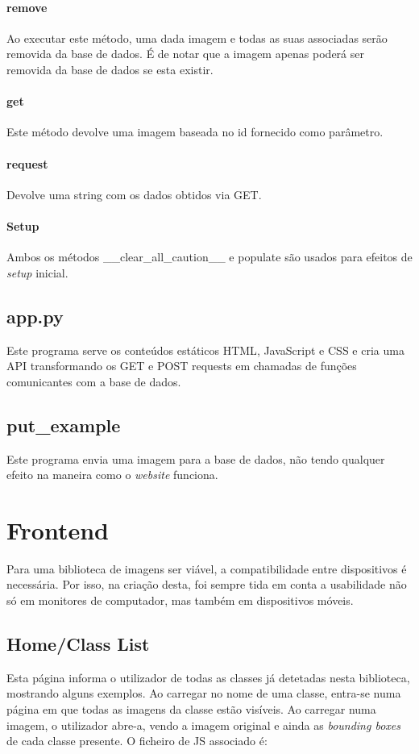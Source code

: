 \documentclass{report}
\begin{document}
\paragraph{remove}
Ao executar este método, uma dada imagem e todas as suas associadas serão removida da base de dados. É de notar que a imagem apenas poderá ser removida da base de dados se esta existir.

\paragraph{get}
Este método devolve uma imagem baseada no id fornecido como parâmetro. 

\paragraph{request}
Devolve uma string com os dados obtidos via GET.

\paragraph{Setup}
Ambos os métodos \_\_clear\_all\_caution\_\_ e  populate são usados para efeitos de \textit{setup} inicial.

\subsection{app.py}
Este programa serve os conteúdos estáticos \ac{HTML}, JavaScript e \ac{CSS} e cria uma API transformando os GET e POST requests em chamadas de funções comunicantes com a base de dados. 

\subsection{put\_example}
Este programa envia uma imagem para a base de dados, não tendo qualquer efeito na maneira como o \textit{website} funciona.

\section{Frontend}
Para uma biblioteca de imagens ser viável, a compatibilidade entre dispositivos é necessária. Por isso, na criação desta, foi sempre tida em conta a usabilidade não só em monitores de computador, mas também em dispositivos móveis. 

\subsection{Home/Class List}
Esta página informa o utilizador de todas as classes já detetadas nesta biblioteca, mostrando alguns exemplos. Ao carregar no nome de uma classe, entra-se numa página em que todas as imagens da classe estão visíveis. Ao carregar numa imagem, o utilizador abre-a, vendo a imagem original e ainda as \textit{bounding boxes} de cada classe presente. O ficheiro de \ac{JS} associado é:
\end{document}
